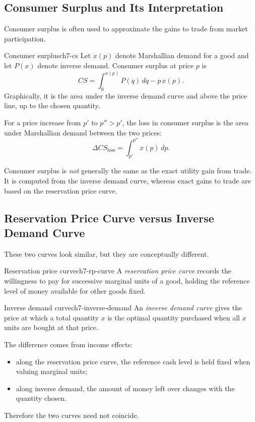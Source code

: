\subsection{Consumer Surplus and Its Interpretation}

Consumer surplus is often used to approximate the gains to trade from market participation.

\begin{definition}{Consumer surplus}{ch7-cs}
Let $x(p)$ denote Marshallian demand for a good and let $P(x)$ denote inverse demand. Consumer surplus at price $p$ is
\[
CS = \int_0^{x(p)} P(q)\,dq - p\,x(p).
\]
Graphically, it is the area under the inverse demand curve and above the price line, up to the chosen quantity.
\end{definition}

For a price increase from $p'$ to $p''>p'$, the loss in consumer surplus is the area under Marshallian demand between the two prices:
\[
\Delta CS_{\text{loss}} = \int_{p'}^{p''} x(p)\,dp.
\]

\begin{commonmistake}
Consumer surplus is \emph{not} generally the same as the exact utility gain from trade. It is computed from the inverse demand curve, whereas exact gains to trade are based on the reservation price curve.
\end{commonmistake}

\subsection{Reservation Price Curve versus Inverse Demand Curve}

These two curves look similar, but they are conceptually different.

\begin{definition}{Reservation price curve}{ch7-rp-curve}
A \emph{reservation price curve} records the willingness to pay for successive marginal units of a good, holding the reference level of money available for other goods fixed.
\end{definition}

\begin{definition}{Inverse demand curve}{ch7-inverse-demand}
An \emph{inverse demand curve} gives the price at which a total quantity $x$ is the optimal quantity purchased when all $x$ units are bought at that price.
\end{definition}

The difference comes from income effects:
\begin{itemize}
    \item along the reservation price curve, the reference cash level is held fixed when valuing marginal units;
    \item along inverse demand, the amount of money left over changes with the quantity chosen.
\end{itemize}
Therefore the two curves need not coincide.

